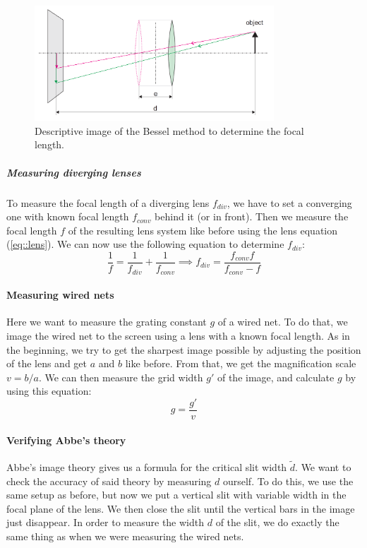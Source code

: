 \begin{figure}[h!]
	\centering
	\includegraphics[width=0.8\textwidth]{img/bessel.PNG}
	\caption{Descriptive image\cite{manual} of the Bessel method to determine the focal length.}
	\label{fig::bessel}
\end{figure}


\subparagraph{Measuring diverging lenses}
\label{chap::div}
To measure the focal length of a diverging lens $f_{div}$, we have to set a converging one with known focal length $f_{conv}$ behind it (or in front). 
Then we measure the focal length $f$ of the resulting lens system like before using the lens equation (\ref{eq::lens}).
We can now use the following equation to determine $f_{div}$:
\begin{equation}
	\frac{1}{f} = \frac{1}{f_{div}} + \frac{1}{f_{conv}} \implies f_{div} = \frac{f_{conv} f}{f_{conv} - f}
	\label{eq::div}
\end{equation}


\paragraph{Measuring wired nets}
\label{chap::net}
Here we want to measure the grating constant $g$ of a wired net.
To do that, we image the wired net to the screen using a lens with a known focal length.
As in the beginning, we try to get the sharpest image possible by adjusting the position of the lens and get $a$ and $b$ like before.
From that, we get the magnification scale $v = b/a$.
We can then measure the grid width $g'$ of the image, and calculate $g$ by using this equation:
\begin{equation}
	g = \frac{g'}{v}
	\label{eq::grid}
\end{equation}

\paragraph{Verifying Abbe's theory}
\label{chap::slit}
Abbe's image theory gives us a formula for the critical slit width $\tilde{d}$.
We want to check the accuracy of said theory by measuring $d$ ourself.
To do this, we use the same setup as before, but now we put a vertical slit with variable width in the focal plane of the lens. 
We then close the slit until the vertical bars in the image just disappear.
In order to measure the width $d$ of the slit, we do exactly the same thing as when we were measuring the wired nets. 

